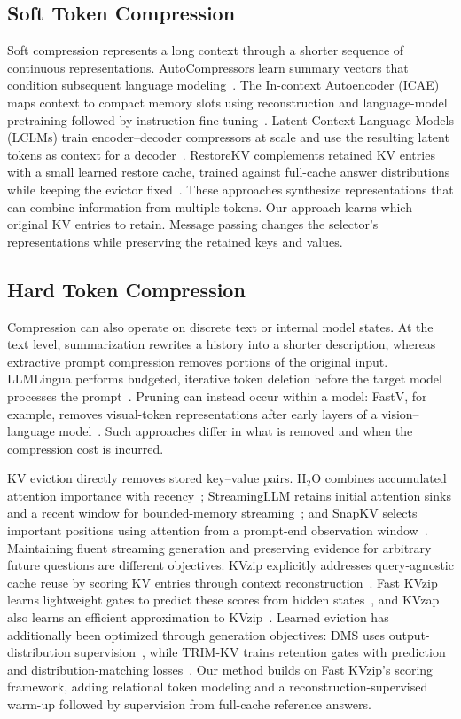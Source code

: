 \subsection{Soft Token Compression}
Soft compression represents a long context through a shorter sequence of continuous representations. AutoCompressors learn summary vectors that condition subsequent language modeling~\citep{chevalier2023autocompressors}. The In-context Autoencoder (ICAE) maps context to compact memory slots using reconstruction and language-model pretraining followed by instruction fine-tuning~\citep{ge2024icae}. Latent Context Language Models (LCLMs) train encoder--decoder compressors at scale and use the resulting latent tokens as context for a decoder~\citep{li2026lclm}. RestoreKV complements retained KV entries with a small learned restore cache, trained against full-cache answer distributions while keeping the evictor fixed~\citep{baek2026restorekv}. These approaches synthesize representations that can combine information from multiple tokens. Our approach learns which original KV entries to retain. Message passing changes the selector's representations while preserving the retained keys and values.

\subsection{Hard Token Compression}
Compression can also operate on discrete text or internal model states. At the text level, summarization rewrites a history into a shorter description, whereas extractive prompt compression removes portions of the original input. LLMLingua performs budgeted, iterative token deletion before the target model processes the prompt~\citep{jiang2023llmlingua}. Pruning can instead occur within a model: FastV, for example, removes visual-token representations after early layers of a vision--language model~\citep{chen2024fastv}. Such approaches differ in what is removed and when the compression cost is incurred.

KV eviction directly removes stored key--value pairs. H$_2$O combines accumulated attention importance with recency~\citep{zhang2023h2o}; StreamingLLM retains initial attention sinks and a recent window for bounded-memory streaming~\citep{xiao2024streamingllm}; and SnapKV selects important positions using attention from a prompt-end observation window~\citep{li2024snapkv}. Maintaining fluent streaming generation and preserving evidence for arbitrary future questions are different objectives. KVzip explicitly addresses query-agnostic cache reuse by scoring KV entries through context reconstruction~\citep{kim2025kvzip}. Fast KVzip learns lightweight gates to predict these scores from hidden states~\citep{kim2026fastkvzip}, and KVzap also learns an efficient approximation to KVzip~\citep{jegou2026kvzap}. Learned eviction has additionally been optimized through generation objectives: DMS uses output-distribution supervision~\citep{lancucki2025dms}, while TRIM-KV trains retention gates with prediction and distribution-matching losses~\citep{bui2026trimkv}. Our method builds on Fast KVzip's scoring framework, adding relational token modeling and a reconstruction-supervised warm-up followed by supervision from full-cache reference answers.


